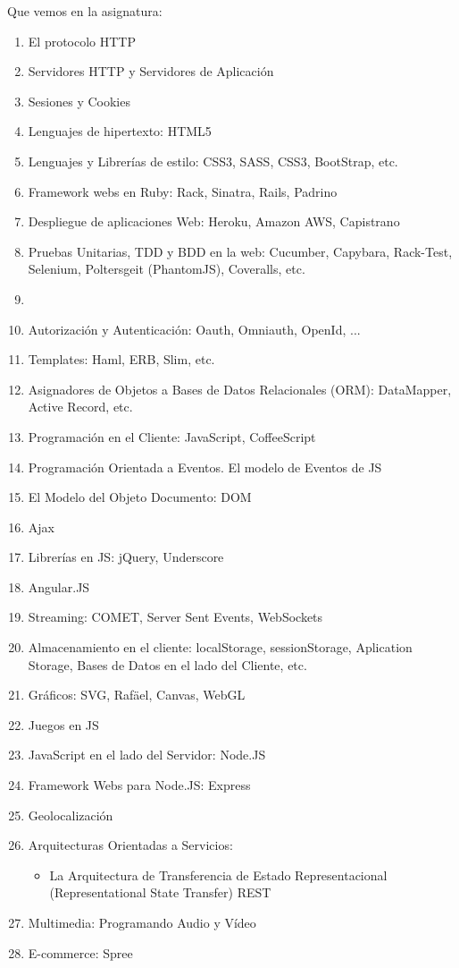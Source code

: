 \documentclass[11pt,a4paper]{article}
\begin{document}
Que vemos en la asignatura:

\begin{enumerate}
\item El protocolo HTTP
\item Servidores HTTP y Servidores de Aplicación
\item Sesiones y Cookies
\item Lenguajes de hipertexto: HTML5
\item Lenguajes y Librerías de estilo: CSS3, SASS, CSS3, BootStrap, etc.
\item Framework webs en Ruby: Rack, Sinatra, Rails, Padrino
\item Despliegue de aplicaciones Web: Heroku, Amazon AWS, Capistrano
\item Pruebas Unitarias, TDD y BDD en la web: Cucumber, Capybara, Rack-Test, Selenium, Poltersgeit (PhantomJS), Coveralls, etc.
  \item
\item Autorización y Autenticación: Oauth, Omniauth, OpenId, ...
\item Templates: Haml, ERB, Slim, etc.
\item Asignadores de Objetos a Bases de Datos Relacionales (ORM): DataMapper, Active Record, etc.
\item Programación en el Cliente: JavaScript, CoffeeScript
\item Programación Orientada a Eventos. El modelo de Eventos de JS
\item El Modelo del Objeto Documento: DOM
\item Ajax 
\item Librerías en JS: jQuery, Underscore
\item Angular.JS
\item Streaming: COMET, Server Sent Events, WebSockets
\item Almacenamiento en el cliente: localStorage, sessionStorage, Aplication Storage, Bases de Datos en el lado del Cliente, etc.
\item Gráficos: SVG, Rafäel, Canvas, WebGL
\item Juegos en JS
\item JavaScript en el lado del Servidor: Node.JS
\item Framework Webs para Node.JS: Express
\item Geolocalización
\item Arquitecturas Orientadas a Servicios:
  \begin{itemize}
  \item La Arquitectura  de Transferencia de Estado Representacional (Representational State Transfer) REST
  \end{itemize}
\item Multimedia: Programando Audio y Vídeo
\item E-commerce: Spree
\end{enumerate}
\end{document}
